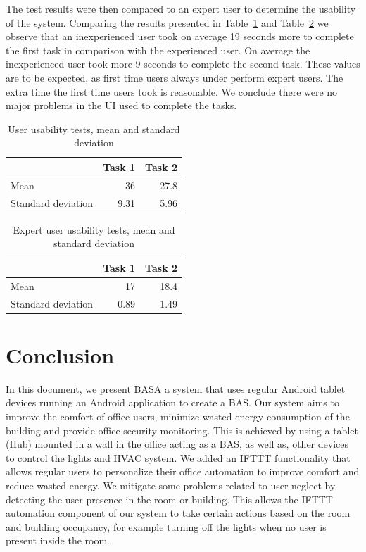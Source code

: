\documentclass[conference]{IEEEtran}
\begin{document}
The test results were then compared to an expert user to determine the usability of the system. Comparing the results presented in Table~\ref{eval:automation2} and Table~\ref{eval:automation3} we observe that an inexperienced user took on average 19 seconds more to complete the first task in comparison with the experienced user. On average the inexperienced user took more 9 seconds to complete the second task. These values are to be expected, as first time users always under perform expert users. The extra time the first time users took is reasonable. We conclude there were no major problems in the \ac{UI} used to complete the tasks.

\begin{table}[h]
\centering
\begin{tabular}{l|r|r|}
\cline{2-3}
 & \multicolumn{1}{l|}{Task 1} & \multicolumn{1}{l|}{Task 2} \\ \hline
\multicolumn{1}{|l|}{Mean} & 36 & 27.8 \\ \hline
\multicolumn{1}{|l|}{Standard deviation} & 9.31 & 5.96 \\ \hline
\end{tabular}
\caption{User usability tests, mean and standard deviation}
\label{eval:automation2}
\end{table}


\begin{table}[h]
\centering
\begin{tabular}{l|r|r|}
\cline{2-3}
 & \multicolumn{1}{l|}{Task 1} & \multicolumn{1}{l|}{Task 2} \\ \hline
\multicolumn{1}{|l|}{Mean} & 17 & 18.4 \\ \hline
\multicolumn{1}{|l|}{Standard deviation} & 0.89 & 1.49 \\ \hline
\end{tabular}
\caption{Expert user usability tests, mean and standard deviation}
\label{eval:automation3}
\end{table}



\section*{Conclusion}

In this document, we present BASA a system that uses regular Android tablet devices running an Android application to create a \ac{BAS}. Our system aims to improve the comfort of office users, minimize wasted energy consumption of the building and provide office security monitoring. 
This is achieved by using a tablet (Hub) mounted in a wall in the office acting as a \ac{BAS}, as well as, other devices to control the lights and \ac{HVAC} system. 
We added an \ac{IFTTT} functionality that allows regular users to personalize their office automation to improve comfort and reduce wasted energy. We mitigate some problems related to user neglect by detecting the user presence in the room or building. This allows the \ac{IFTTT} automation component of our system to take certain actions based on the room and building occupancy, for example turning off the lights when no user is present inside the room.
\end{document}
